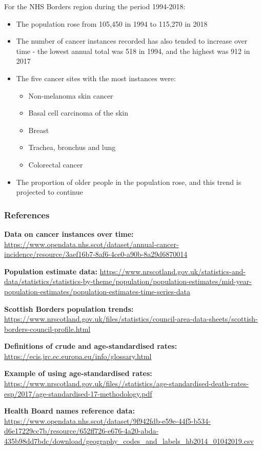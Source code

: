 \documentclass[
]{article}
\begin{document}
For the NHS Borders region during the period 1994-2018:

\begin{itemize}
\item
  The population rose from 105,450 in 1994 to 115,270 in 2018
\item
  The number of cancer instances recorded has also tended to increase
  over time - the lowest annual total was 518 in 1994, and the highest
  was 912 in 2017
\item
  The five cancer sites with the most instances were:

  \begin{itemize}
  \item
    Non-melanoma skin cancer
  \item
    Basal cell carcinoma of the skin
  \item
    Breast
  \item
    Trachea, bronchus and lung
  \item
    Colorectal cancer
  \end{itemize}
\item
  The proportion of older people in the population rose, and this trend
  is projected to continue
\end{itemize}

\hypertarget{references}{%
\subsubsection{\texorpdfstring{{References}}{References}}\label{references}}

\textbf{Data on cancer instances over time:}
\url{https://www.opendata.nhs.scot/dataset/annual-cancer-incidence/resource/3aef16b7-8af6-4ce0-a90b-8a29d6870014}

\textbf{Population estimate data: }
\url{https://www.nrscotland.gov.uk/statistics-and-data/statistics/statistics-by-theme/population/population-estimates/mid-year-population-estimates/population-estimates-time-series-data}

\textbf{Scottish Borders population trends:}
\url{https://www.nrscotland.gov.uk/files/statistics/council-area-data-sheets/scottish-borders-council-profile.html}

\textbf{Definitions of crude and age-standardised rates:}
\url{https://ecis.jrc.ec.europa.eu/info/glossary.html}

\textbf{Example of using age-standardised rates:}
\url{https://www.nrscotland.gov.uk/files//statistics/age-standardised-death-rates-esp/2017/age-standardised-17-methodology.pdf}

\textbf{Health Board names reference data:}
\url{https://www.opendata.nhs.scot/dataset/9f942fdb-e59e-44f5-b534-d6e17229cc7b/resource/652ff726-e676-4a20-abda-435b98dd7bdc/download/geography_codes_and_labels_hb2014_01042019.csv}
\end{document}
